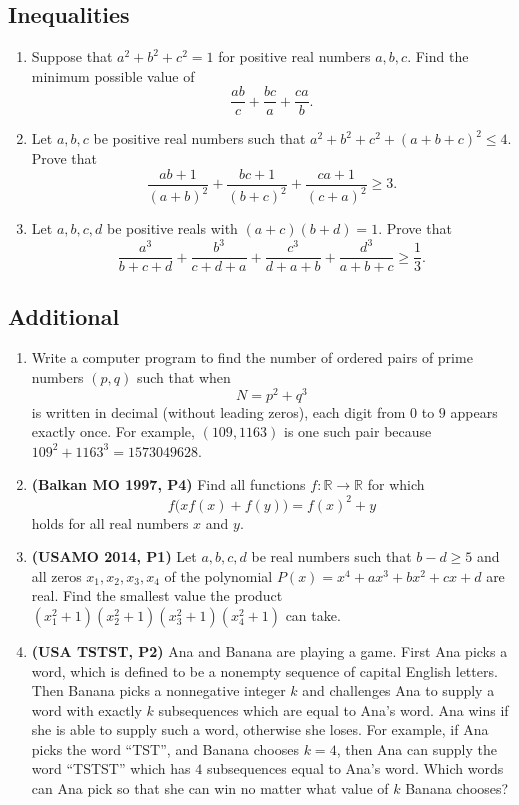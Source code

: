 \documentclass[12pt]{article}
\begin{document}
    \subsection{Inequalities}
      \begin{enumerate}[label=\textbf{B.\arabic*.}]
        \item Suppose that $a^2 + b^2 + c^2 = 1$ for positive real numbers $a, b, c$. Find the minimum possible value of
          \[
            \frac{ab}{c} + \frac{bc}{a} + \frac{ca}{b}.
          \]
        \item Let $a, b, c$ be positive real numbers such that $a^2 + b^2 + c^2 + (a+b+c)^2 \le 4$. Prove that
          \[
            \frac{ab + 1}{(a+b)^2} + \frac{bc + 1}{(b+c)^2} + \frac{ca + 1}{(c+a)^2} \ge 3.
          \]
        \item Let $a, b, c, d$ be positive reals with $(a+c)(b+d) = 1$. Prove that
          \[
            \frac{a^3}{b+c+d} + \frac{b^3}{c+d+a} + \frac{c^3}{d+a+b} + \frac{d^3}{a+b+c} \ge \frac13.
          \]
      \end{enumerate}
    \subsection{Additional}
      \begin{enumerate}[label=\textbf{C.\arabic*.}]
        \item Write a computer program to find the number of ordered pairs of prime numbers $(p,q)$ such that when
          \[
            N = p^2 + q^3
          \]
          is written in decimal (without leading zeros), each digit from $0$ to $9$ appears exactly once. For example, $(109,1163)$ is one
          such pair because $109^2 + 1163^3 = 1573049628$.
        \item \textbf{\textcolor{color2}{(Balkan MO 1997, P4)}} Find all functions $f:\mathbb{R}\to\mathbb{R}$ for which
          \[
            f\big(xf(x)+f(y)\big)=f(x)^2+y
          \]
          holds for all real numbers $x$ and $y$.
        \item \textbf{\textcolor{color2}{(USAMO 2014, P1)}} Let $a,b,c,d$ be real numbers such that $b-d\ge 5$ and all zeros $x_1,x_2,x_3,x_4$ of the polynomial $P(x)=x^4+ax^3+bx^2+cx+d$ are 
          real. Find the smallest value the product $(x_1^2+1)(x_2^2+1)(x_3^2+1)(x_4^2+1)$ can take.
        \item \textbf{\textcolor{color2}{(USA TSTST, P2)}} Ana and Banana are playing a game. First Ana picks a word, which is defined to be a nonempty sequence of capital English
          letters. Then Banana picks a nonnegative integer $k$ and challenges Ana to supply a word with exactly $k$ subsequences which are 
          equal to Ana's word. Ana wins if she is able to supply such a word, otherwise she loses. For example, if Ana picks the word “TST”,
          and Banana chooses $k=4$, then Ana can supply the word “TSTST” which has $4$ subsequences equal to Ana's word. Which words can Ana 
          pick so that she can win no matter what value of $k$ Banana chooses?
      \end{enumerate}
\end{document}
